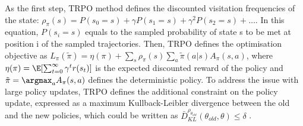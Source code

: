 As the first step, TRPO method defines the discounted visitation frequencies of
the state: \begin{math}\rho_\pi(s)=P(s_0=s)+\gamma P(s_1=s)+\gamma^2 P(s_2=s)+\ldots\end{math}.
In this equation, \begin{math}P(s_i=s)\end{math} equals to the sampled
probability of state s to be met at position i of the sampled trajectories.
Then, TRPO defines the optimisation objective as
\begin{math}L_\pi(\tilde{\pi})=\eta(\pi) +
  \sum_s\rho_\pi(s)\sum_a\tilde{\pi}(a|s)A_\pi(s, a)\end{math},
where \begin{math}\eta(\pi)=\E[\sum_{t=0}^{\infty}\gamma^t r(s_t)]\end{math} is
the expected discounted reward of the policy and
\begin{math}\tilde{\pi}=\argmax_aA_\pi(s, a)\end{math} defines the deterministic policy.
To address the issue with large policy updates, TRPO defines the additional
constraint on the policy update, expressed as a maximum Kullback-Leibler
divergence between the old and the new policies, which could be written as
\begin{math}\bar{D}_{KL}^{\rho_{\theta_{old}}}(\theta_{old},\theta) \leq \delta\end{math}
.





